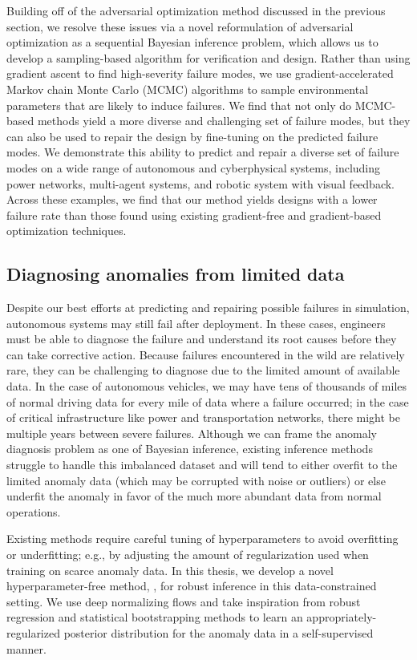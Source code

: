 Building off of the adversarial optimization method discussed in the previous section, we resolve these issues via a novel reformulation of adversarial optimization as a sequential Bayesian inference problem, which allows us to develop a sampling-based algorithm for verification and design. Rather than using gradient ascent to find high-severity failure modes, we use gradient-accelerated Markov chain Monte Carlo (MCMC) algorithms to sample environmental parameters that are likely to induce failures. We find that not only do MCMC-based methods yield a more diverse and challenging set of failure modes, but they can also be used to repair the design by fine-tuning on the predicted failure modes. We demonstrate this ability to predict and repair a diverse set of failure modes on a wide range of autonomous and cyberphysical systems, including power networks, multi-agent systems, and robotic system with visual feedback. Across these examples, we find that our method yields designs with a lower failure rate than those found using existing gradient-free and gradient-based optimization techniques.

\subsection{Diagnosing anomalies from limited data}

Despite our best efforts at predicting and repairing possible failures in simulation, autonomous systems may still fail after deployment. In these cases, engineers must be able to diagnose the failure and understand its root causes before they can take corrective action. Because failures encountered in the wild are relatively rare, they can be challenging to diagnose due to the limited amount of available data. In the case of autonomous vehicles, we may have tens of thousands of miles of normal driving data for every mile of data where a failure occurred; in the case of critical infrastructure like power and transportation networks, there might be multiple years between severe failures. Although we can frame the anomaly diagnosis problem as one of Bayesian inference, existing inference methods struggle to handle this imbalanced dataset and will tend to either overfit to the limited anomaly data (which may be corrupted with noise or outliers) or else underfit the anomaly in favor of the much more abundant data from normal operations.

Existing methods require careful tuning of hyperparameters to avoid overfitting or underfitting; e.g., by adjusting the amount of regularization used when training on scarce anomaly data. In this thesis, we develop a novel hyperparameter-free method, \ouralg{}, for robust inference in this data-constrained setting. We use deep normalizing flows and take inspiration from robust regression and statistical bootstrapping methods to learn an appropriately-regularized posterior distribution for the anomaly data in a self-supervised manner.

